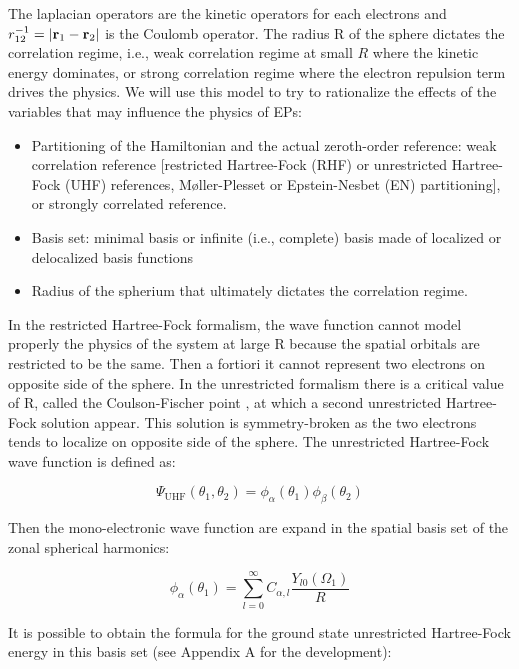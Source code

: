 \documentclass[11pt,a4paper]{article}
\begin{document}
The laplacian operators are the kinetic operators for each electrons and $r_{12}^{-1} = \abs{\vb{r}_1 - \vb{r}_2}$ is the Coulomb operator. The radius R of the sphere dictates the correlation regime, i.e., weak correlation regime at small $R$ where the kinetic energy dominates, or strong correlation regime where the electron repulsion term drives the physics. We will use this model to try to rationalize the effects of the variables that may influence the physics of EPs:
\begin{itemize}
	\item Partitioning of the Hamiltonian and the actual zeroth-order reference: weak correlation reference [restricted Hartree-Fock (RHF) or unrestricted Hartree-Fock (UHF) references, M{\o}ller-Plesset or Epstein-Nesbet (EN) partitioning], or strongly correlated reference.
	\item Basis set: minimal basis or infinite (i.e., complete) basis made of localized or delocalized basis functions
	\item Radius of the spherium that ultimately dictates the correlation regime.
\end{itemize}

In the restricted Hartree-Fock formalism, the wave function cannot model properly the physics of the system at large R because the spatial orbitals are restricted to be the same. Then a fortiori it cannot represent two electrons on opposite side of the sphere. In the unrestricted formalism there is a critical value of R, called the Coulson-Fischer point \cite{Coulson_1949}, at which a second unrestricted Hartree-Fock solution appear. This solution is symmetry-broken as the two electrons tends to localize on opposite side of the sphere. The unrestricted Hartree-Fock wave function is defined as:

\begin{equation}\label{eq:UHF_WF}
\Psi_{\text{UHF}}(\theta_1,\theta_2)=\phi_\alpha(\theta_1)\phi_\beta(\theta_2)
\end{equation}

Then the mono-electronic wave function are expand in the spatial basis set of the zonal spherical harmonics:

\begin{equation}
\phi_\alpha(\theta_1)=\sum\limits_{l=0}^{\infty}C_{\alpha,l}\frac{Y_{l0}(\Omega_1)}{R}
\end{equation}

It is possible to obtain the formula for the ground state unrestricted Hartree-Fock energy in this basis set (see Appendix A for the development):
\end{document}
